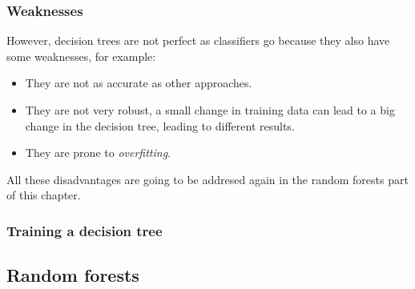 \documentclass[11pt]{article}
\begin{document}
      \subsubsection{Weaknesses}
        However, decision trees are not perfect as classifiers go because they also have some weaknesses, for example:
        \begin{itemize}
        \item They are not as accurate as other approaches. \cite{isl}
        \item They are not very robust, a small change in training data can lead to a big change in the decision tree, leading to different results. \cite{isl}
        \item They are prone to {\it overfitting}. \cite{isl}
        \end{itemize}
        All these disadvantages are going to be addresed again in the random forests part of this chapter.
      \subsubsection{Training a decision tree}
        
    \newpage 
    \subsection{Random forests}
  \newpage
\end{document}
